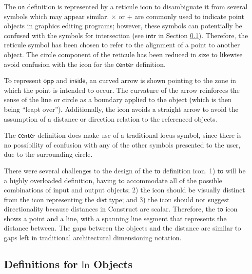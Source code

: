 \documentclass[twoside,openright,11pt]{report}
\begin{document}
The $\mathsf{on}$ definition is represented by a reticule icon to disambiguate it from several symbols which may appear similar. 
$\times$ or $+$ are commonly used to indicate point objects in graphics editing programs; however, these symbols can potentially be confused with the symbols for intersection (see $\mathsf{intr}$ in Section \ref{subsec:def-ln}). 
Therefore, the reticule symbol has been chosen to refer to the alignment of a point to another object. 
The circle component of the reticule has been reduced in size to likewise avoid confusion with the icon for the $\mathsf{center}$ definition.

To represent $\mathsf{opp}$ and $\mathsf{inside}$, an curved arrow is shown pointing to the zone in which the point is intended to occur. 
The curvature of the arrow reinforces the sense of the line or circle as a boundary applied to the object (which is then being ``leapt over'').
Additionally, the icon avoids a straight arrow to avoid the assumption of a distance or direction relation to the referenced objects.

The $\mathsf{center}$ definition does make use of a traditional locus symbol, since there is no possibility of confusion with any of the other symbols presented to the user, due to the surrounding circle.

There were several challenges to the design of the $\mathsf{to}$ definition icon. 
1) $\mathsf{to}$ will be a highly overloaded definition, having to accommodate all of the possible combinations of input and output objects; 2) the icon should be visually distinct from the icon representing the $\mathsf{dist}$ type; and 3) the icon should not suggest directionality because distances in Construct are scalar.
Therefore, the $\mathsf{to}$ icon shows a point and a line, with a spanning line segment that represents the distance between. 
The gaps between the objects and the distance are similar to gaps left in traditional architectural dimensioning notation.

\subsection{Definitions for $\mathsf{ln}$ Objects}
\label{subsec:def-ln}
\end{document}
